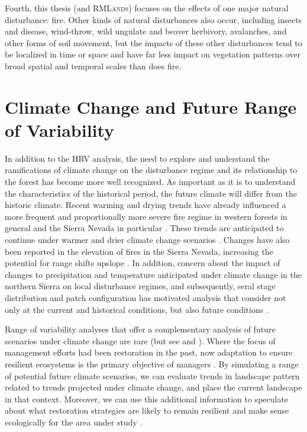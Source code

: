 Fourth, this thesis (and \textsc{RMLands}) focuses on the effects of one major natural disturbance: fire. Other kinds of natural disturbances also occur, including insects and disease, wind-throw, wild ungulate and beaver herbivory, avalanches, and other forms of soil movement, but the impacts of these other disturbances tend to be localized in time or space and have far less impact on vegetation patterns over broad spatial and temporal scales than does fire.

\section{Climate Change and Future Range of Variability}

In addition to the HRV analysis, the need to explore and understand the ramifications of climate change on the disturbance regime and its relationship to the forest has become more well recognized. As important as it is to understand the characteristics of the historical period, the future climate will differ from the historic climate. 
%
Recent warming and drying trends have already influenced a more frequent and proportionally more severe fire regime in western forests in general and the Sierra Nevada in particular \citep{McKenzie2004,Westerling2011,Miller2012}. These trends are anticipated to continue under warmer and drier climate change scenarios \citep{Westerling2008}. Changes have also been reported in the elevation of fires in the Sierra Nevada, increasing the potential for range shifts upslope \citep{Schwartz2015}. In addition, concern about the impact of changes to precipitation and temperature anticipated under climate change in the northern Sierra on local disturbance regimes, and subsequently, seral stage distribution and patch configuration has motivated analysis that consider not only at the current and historical conditions, but also future conditions \citep{Fule2008,North2012}.

Range of variability analyses that offer a complementary analysis of future scenarios under climate change are rare (but see \cite{Keane2008} and \cite{Duveneck2014}). Where the focus of management efforts had been restoration in the past, now adaptation to ensure resilient ecosystems is the primary objective of managers \citep{Stephens2010}. By simulating a range of potential future climate scenarios, we can evaluate trends in landscape pattern related to trends projected under climate change, and place the current landscape in that context. Moreover, we can use this additional information to speculate about what restoration strategies are likely to remain resilient and make sense ecologically for the area under study \citep{Duncan2010}. 

